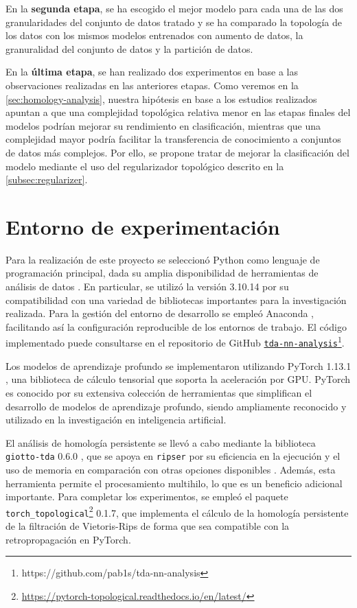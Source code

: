 En la \textbf{segunda etapa}, se ha escogido el mejor modelo para cada una de
las dos granularidades del conjunto de datos tratado y se ha comparado la
topología de los datos con los mismos modelos entrenados con aumento de datos, la
granuralidad del conjunto de datos y la partición de datos.

En la \textbf{última etapa}, se han realizado dos experimentos en base a las observaciones
realizadas en las anteriores etapas. Como veremos en la
\autoref{sec:homology-analysis}, nuestra hipótesis en base a los estudios realizados
apuntan a que una complejidad topológica relativa menor en las etapas finales del
modelos podrían mejorar su rendimiento en clasificación, mientras que una
complejidad mayor podría facilitar la transferencia de conocimiento a conjuntos
de datos más complejos. Por ello, se propone tratar de mejorar la clasificación
del modelo mediante el uso del regularizador topológico descrito en la
\autoref{subsec:regularizer}.

\section{Entorno de experimentación}

Para la realización de este proyecto se seleccionó Python como lenguaje de programación
principal, dada su amplia disponibilidad de herramientas de análisis de datos
\cite{10.5555/1593511}. En particular, se utilizó la versión 3.10.14 por su compatibilidad
con una variedad de bibliotecas importantes para la investigación realizada.
Para la gestión del entorno de desarrollo se empleó Anaconda \cite{anaconda}, facilitando
así la configuración reproducible de los entornos de trabajo. El código
implementado puede consultarse en el repositorio de GitHub
\href{https://github.com/pab1s/tda-nn-analysis}{\texttt{tda-nn-analysis}}\footnote{https://github.com/pab1s/tda-nn-analysis}.

Los modelos de aprendizaje profundo se implementaron utilizando PyTorch 1.13.1
\cite{NEURIPS2019_9015}, una biblioteca de cálculo tensorial que soporta la aceleración
por GPU. PyTorch es conocido por su extensiva colección de herramientas que
simplifican el desarrollo de modelos de aprendizaje profundo, siendo ampliamente
reconocido y utilizado en la investigación en inteligencia artificial.

El análisis de homología persistente se llevó a cabo mediante la biblioteca \texttt{giotto-tda}
0.6.0 \cite{giotto-tda}, que se apoya en \texttt{ripser} \cite{ctralie2018ripser}
por su eficiencia en la ejecución y el uso de memoria en comparación con otras opciones
disponibles \cite{Otter_2017}. Además, esta herramienta permite el procesamiento
multihilo, lo que es un beneficio adicional importante. Para completar los experimentos,
se empleó el paquete \texttt{torch\_topological}\footnote{\href{https://pytorch-topological.readthedocs.io/en/latest/}{https://pytorch-topological.readthedocs.io/en/latest/}}
0.1.7, que implementa el cálculo de la homología persistente de la filtración de
Vietoris-Rips de forma que sea compatible con la retropropagación en PyTorch. %

